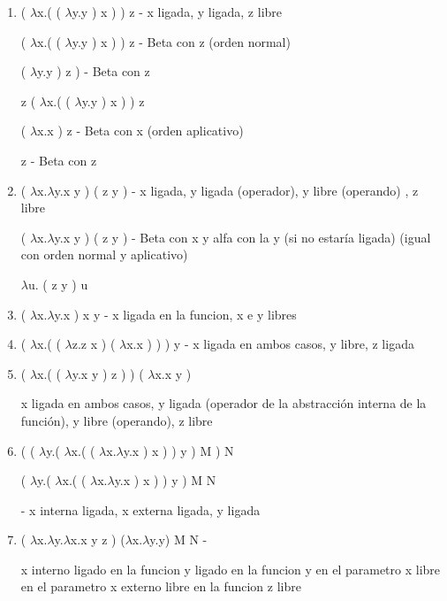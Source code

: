 \begin{enumerate}
    \item  ( $\lambda$x.( ( $\lambda$y.y ) x ) ) z  -  x ligada, y ligada, z libre %
    
	( $\lambda$x.( ( $\lambda$y.y ) x ) ) z       - Beta con z (orden normal)

     ( $\lambda$y.y ) z ) - Beta con z

      			 z
     ( $\lambda$x.( ( $\lambda$y.y ) x ) ) z 
    
	( $\lambda$x.x  ) z       - Beta con x (orden aplicativo)

     z  - Beta con z
    
    
    
    \item ( $\lambda$x.$\lambda$y.x y ) ( z y )  -  x ligada, y ligada (operador), y libre (operando) , z libre %
    
( $\lambda$x.$\lambda$y.x y ) ( z y ) - Beta con x y alfa con la y (si no estaría ligada) (igual con orden normal y aplicativo)
    
$\lambda$u. ( z y )  u 

    \item ( $\lambda$x.$\lambda$y.x ) x y -  x ligada en la funcion, x e y libres %
    

    \item ( $\lambda$x.( ( $\lambda$z.z x ) ( $\lambda$x.x ) ) ) y - x ligada en ambos casos, y libre, z ligada %
        
    \item ( $\lambda$x.( ( $\lambda$y.x y ) z ) ) ( $\lambda$x.x y ) %
    
     x ligada en ambos casos, y ligada (operador de la abstracción interna de la función), y libre (operando), z libre
    

    \item ( ( $\lambda$y.( $\lambda$x.( ( $\lambda$x.$\lambda$y.x ) x ) ) y ) M ) N %
    
     ( $\lambda$y.( $\lambda$x.( ( $\lambda$x.$\lambda$y.x ) x ) ) y ) M  N
    
    
     - x interna ligada, x externa ligada, y ligada
    
    
    \item ( $\lambda$x.$\lambda$y.$\lambda$x.x y z ) ($\lambda$x.$\lambda$y.y) M N - %
    
    x interno ligado en la funcion
    y ligado en la funcion y en el parametro
    x libre en el parametro
    x externo libre en la funcion
    z libre
    

\end{enumerate}
